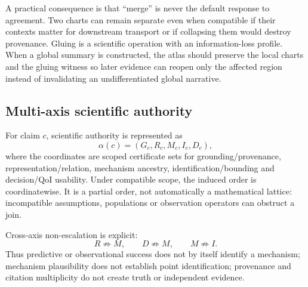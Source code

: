 A practical consequence is that ``merge'' is never the default response to agreement. Two charts can remain separate even when compatible if their contexts matter for downstream transport or if collapsing them would destroy provenance. Gluing is a scientific operation with an information-loss profile. When a global summary is constructed, the atlas should preserve the local charts and the gluing witness so later evidence can reopen only the affected region instead of invalidating an undifferentiated global narrative.

\subsection{Multi-axis scientific authority}
For claim $c$, scientific authority is represented as
\begin{equation}\alpha(c)=(G_c,R_c,M_c,I_c,D_c),\end{equation}
where the coordinates are scoped certificate sets for grounding/provenance, representation/relation, mechanism ancestry, identification/bounding and decision/QoI usability. Under compatible scope, the induced order is coordinatewise. It is a partial order, not automatically a mathematical lattice: incompatible assumptions, populations or observation operators can obstruct a join.

Cross-axis non-escalation is explicit:
\begin{equation}R\not\Rightarrow M,\qquad D\not\Rightarrow M,\qquad M\not\Rightarrow I.\end{equation}
Thus predictive or observational success does not by itself identify a mechanism; mechanism plausibility does not establish point identification; provenance and citation multiplicity do not create truth or independent evidence.
